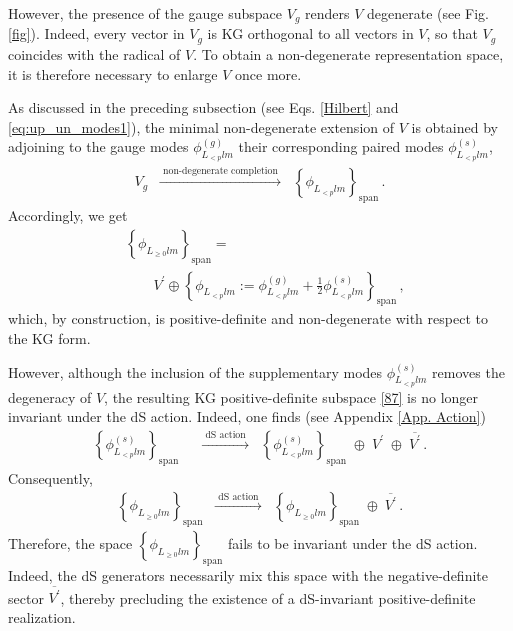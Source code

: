 \documentclass[aps,twocolumn,nofootinbib]{revtex4}
\begin{document}
However, the presence of the gauge subspace $V_g$ renders $V$ degenerate (see Fig. \ref{fig}). Indeed, every vector in $V_g$ is KG orthogonal to all vectors in $V$, so that $V_g$ coincides with the radical of $V$. To obtain a non-degenerate representation space, it is therefore necessary to enlarge $V$ once more.

As discussed in the preceding subsection (see Eqs. \eqref{Hilbert} and \eqref{eq:up_un_modes1}), the minimal non-degenerate extension of $V$ is obtained by adjoining to the gauge modes $\phi^{(g)}_{L^{}_{<p}lm}$ their corresponding paired modes $\phi^{(s)}_{L^{}_{<p}lm}$,
\begin{align}
    V_g \;\;\xrightarrow[]{\text{ non-degenerate completion }}\;\; \left\{\phi^{}_{L^{}_{<p}lm}\right\}_{\mathrm{span}} \,.
\end{align}
Accordingly, we get
\begin{align} \label{87}
    &\left\{ \phi^{}_{L^{}_{\geqslant 0}lm} \right\}_{\mathrm{span}} = \nonumber\\[3pt]
    &\quad\quad V^\prime \oplus \left\{\phi^{}_{L^{}_{<p}lm} := \phi^{(g)}_{L^{}_{<p}lm} + \frac{1}{2} \phi^{(s)}_{L^{}_{<p}lm}\right\}_{\mathrm{span}} \,,
\end{align}
which, by construction, is positive-definite and non-degenerate with respect to the KG form.

However, although the inclusion of the supplementary modes $\phi^{(s)}_{L^{}_{<p}lm}$ removes the degeneracy of $V$, the resulting KG positive-definite subspace \eqref{87} is no longer invariant under the dS action. Indeed, one finds (see Appendix \ref{App. Action})
\begin{align}\label{supp.ds}
    \left\{ \phi^{(s)}_{L^{}_{<p}lm} \right\}_{\mathrm{span}} \;\; & \xrightarrow[]{\text{ dS action }}\;\;\left\{\phi^{(s)}_{L^{}_{<p}lm}\right\}_{\mathrm{span}} \; \oplus \; V^\prime \; \oplus \; \overline{V^\prime}\,.
\end{align}
Consequently,
\begin{align}
   \left\{\phi^{}_{L^{}_{\geqslant 0}lm}\right\}_{\mathrm{span}} \;\; \xrightarrow[]{\text{ dS action }} \;\; \left\{\phi^{}_{L^{}_{\geqslant 0}lm}\right\}_{\mathrm{span}} \; \oplus \; \overline{V^\prime}\,.
\end{align}
Therefore, the space $\left\{\phi^{}_{L^{}_{\geqslant 0}lm}\right\}_{\mathrm{span}}$ fails to be invariant under the dS action. Indeed, the dS generators necessarily mix this space with the negative-definite sector $\overline{V^\prime}$, thereby precluding the existence of a dS-invariant positive-definite realization.
\end{document}
